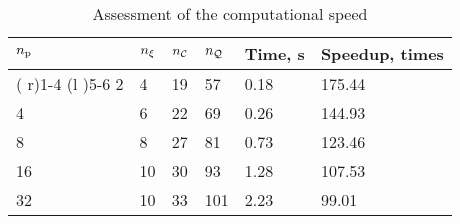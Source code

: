 \begin{table}[tr]
  \centering
  \caption{Assessment of the computational speed}
  \vspace{-0.5em}
  \begin{tabular*}{1\linewidth}{R{20pt}R{20pt}R{20pt}R{20pt}R{50pt}R{50pt}}
    \toprule
    ${n_\text{p}}$ & ${n_\xi}$ & ${n_\mathcal{C}}$ & ${n_\mathcal{Q}}$ & Time, s & Speedup, times \\
    \cmidrule( r){1-4}
    \cmidrule(l ){5-6}
     2 &  4 & 19 &  57 & 0.18 & 175.44 \\
     4 &  6 & 22 &  69 & 0.26 & 144.93 \\
     8 &  8 & 27 &  81 & 0.73 & 123.46 \\
    16 & 10 & 30 &  93 & 1.28 & 107.53 \\
    32 & 10 & 33 & 101 & 2.23 &  99.01 \\
    \bottomrule
  \end{tabular*}
\end{table}
